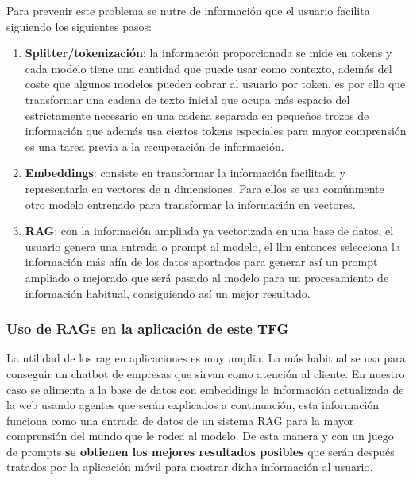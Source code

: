 Para prevenir este problema se nutre de información que el usuario facilita siguiendo los siguientes pasos:
\begin{enumerate}
	\item \textbf{Splitter/tokenización}: la información proporcionada se mide en tokens y cada modelo tiene una cantidad que puede usar como contexto, además del coste que algunos modelos pueden cobrar al usuario por token, es por ello que transformar una cadena de texto inicial que ocupa más espacio del estrictamente necesario en una cadena separada en pequeños trozos de información que además usa ciertos tokens especiales para mayor comprensión es una tarea previa a la recuperación de información.

	\item \textbf{Embeddings}: consiste en transformar la información facilitada y representarla en vectores de n dimensiones. Para ellos se usa comúnmente otro modelo entrenado para transformar la información en vectores.
	
	
	\item \textbf{RAG}: con la información ampliada ya vectorizada en una base de datos, el usuario genera una entrada o prompt al modelo, el \acrshort{llm} entonces selecciona la información más afín de los datos aportados para generar así un prompt ampliado o mejorado que será pasado al modelo para un procesamiento de información habitual, consiguiendo así un mejor resultado.
	
\end{enumerate}

\subsubsection{Uso de RAGs en la aplicación de este TFG}
La utilidad de los \acrfull{rag} en aplicaciones es muy amplia. La más habitual se usa para conseguir un chatbot de empresas que sirvan como atención al cliente. 
En nuestro caso se alimenta a la base de datos con embeddings la información actualizada de la web usando agentes que serán explicados a continuación, esta información funciona como una entrada de datos de un sistema RAG para la mayor comprensión del mundo que le rodea al modelo. De esta manera y con un juego de prompts \textbf{se obtienen los mejores resultados posibles} que serán después tratados por la aplicación móvil para mostrar dicha información al usuario.


